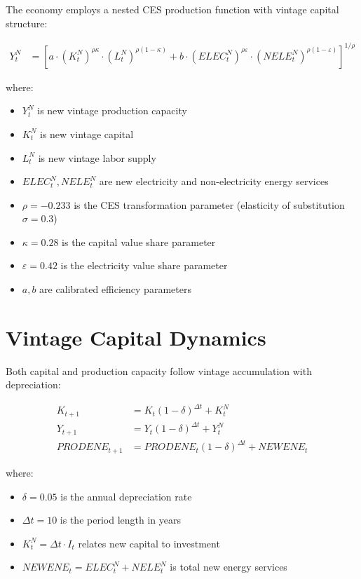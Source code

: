 \documentclass{article}
\begin{document}
The economy employs a nested CES production function with vintage capital structure:

\begin{align}
Y_t^N &= \left[a \cdot (K_t^N)^{\rho \kappa} \cdot (L_t^N)^{\rho(1-\kappa)} + b \cdot (ELEC_t^N)^{\rho \varepsilon} \cdot (NELE_t^N)^{\rho(1-\varepsilon)}\right]^{1/\rho}
\end{align}

where:
\begin{itemize}
\item $Y_t^N$ is new vintage production capacity
\item $K_t^N$ is new vintage capital 
\item $L_t^N$ is new vintage labor supply
\item $ELEC_t^N, NELE_t^N$ are new electricity and non-electricity energy services
\item $\rho = -0.233$ is the CES transformation parameter (elasticity of substitution $\sigma = 0.3$)
\item $\kappa = 0.28$ is the capital value share parameter
\item $\varepsilon = 0.42$ is the electricity value share parameter
\item $a, b$ are calibrated efficiency parameters
\end{itemize}

\section{Vintage Capital Dynamics}

Both capital and production capacity follow vintage accumulation with depreciation:

\begin{align}
K_{t+1} &= K_t (1-\delta)^{\Delta t} + K_t^N \\
Y_{t+1} &= Y_t (1-\delta)^{\Delta t} + Y_t^N \\
PRODENE_{t+1} &= PRODENE_t (1-\delta)^{\Delta t} + NEWENE_t
\end{align}

where:
\begin{itemize}
\item $\delta = 0.05$ is the annual depreciation rate
\item $\Delta t = 10$ is the period length in years
\item $K_t^N = \Delta t \cdot I_t$ relates new capital to investment
\item $NEWENE_t = ELEC_t^N + NELE_t^N$ is total new energy services
\end{itemize}
\end{document}
